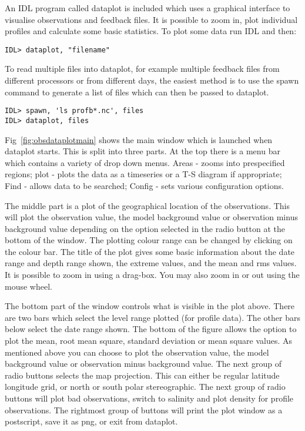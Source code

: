\documentclass[NEMO_book]{subfiles}
\begin{document}
An IDL program called dataplot is included which uses a graphical interface to visualise
observations and feedback files. It is possible to zoom in, plot individual profiles and
calculate some basic statistics. To plot some data run IDL and then:
\begin{alltt}
\footnotesize
\begin{verbatim}
IDL> dataplot, "filename"
\end{verbatim}
\end{alltt}

To read multiple files into dataplot, for example multiple feedback files from different
processors or from different days, the easiest method is to use the spawn command to generate
a list of files which can then be passed to dataplot.
\begin{alltt}
\footnotesize
\begin{verbatim}
IDL> spawn, 'ls profb*.nc', files
IDL> dataplot, files
\end{verbatim}
\end{alltt}

Fig~\ref{fig:obsdataplotmain} shows the main window which is launched when dataplot starts.
This is split into three parts. At the top there is a menu bar which contains a variety of
drop down menus. Areas - zooms into prespecified regions; plot - plots the data as a
timeseries or a T-S diagram if appropriate; Find - allows data to be searched; Config - sets
various configuration options.

The middle part is a plot of the geographical location of the observations. This will plot the
observation value, the model background value or observation minus background value depending
on the option selected in the radio button at the bottom of the window. The plotting colour
range can be changed by clicking on the colour bar. The title of the plot gives some basic
information about the date range and depth range shown, the extreme values, and the mean and
rms values. It is possible to zoom in using a drag-box. You may also zoom in or out using the
mouse wheel.

The bottom part of the window controls what is visible in the plot above. There are two bars
which select the level range plotted (for profile data). The other bars below select the date
range shown. The bottom of the figure allows the option to plot the mean, root mean square,
standard deviation or mean square values. As mentioned above you can choose to plot the
observation value, the model background value or observation minus background value. The next
group of radio buttons selects the map projection. This can either be regular latitude
longitude grid, or north or south polar stereographic. The next group of radio buttons will
plot bad observations, switch to salinity and plot density for profile observations. The
rightmost group of buttons will print the plot window as a postscript, save it as png, or exit
from dataplot.
\end{document}
